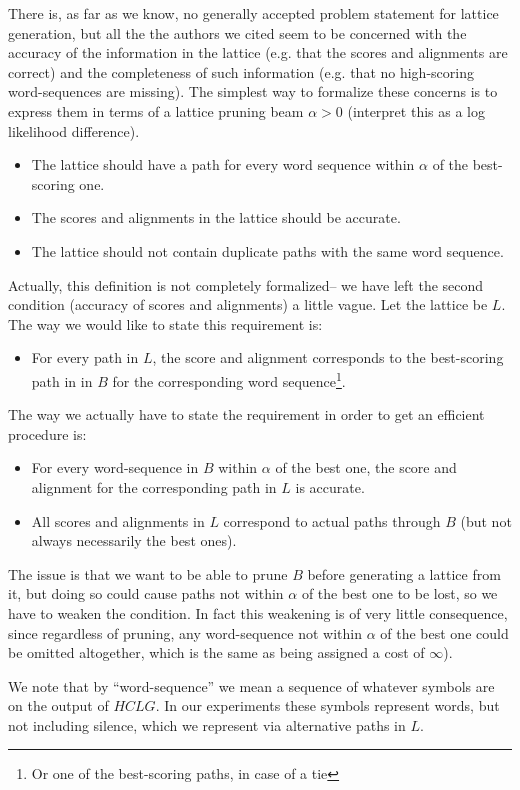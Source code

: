 \documentclass{article}
\def\HCLG{{\mathit{HCLG}}}
\begin{document}
There is, as far as we know, no generally accepted problem statement
for lattice generation, but all the the authors we cited seem to
be concerned with the accuracy of the information in the lattice (e.g. that the
scores and alignments are correct) and the completeness of such information (e.g.
that no high-scoring word-sequences are missing).  The simplest
way to formalize these concerns is to express them in terms of a lattice 
pruning beam $\alpha > 0$ (interpret this as a log likelihood difference).
\begin{itemize}
  \item The lattice should have a path for every word sequence within $\alpha$ of the best-scoring one.
  \item The scores and alignments in the lattice should be accurate.
  \item The lattice should not contain duplicate paths with the same word sequence.
\end{itemize}
Actually, this definition is not completely formalized-- we have left
the second condition (accuracy of scores and alignments) a little vague.
Let the lattice be $L$.  The way we would like to state this requirement is:
\begin{itemize}
  \item For every path in $L$, the score and alignment corresponds to 
   the best-scoring path in in $B$ for the corresponding word
   sequence\footnote{Or one of the best-scoring paths, in case of a tie}.
\end{itemize}
The way we actually have to state the requirement in order to get an efficient procedure is:
\begin{itemize}
  \item For every word-sequence in $B$ within $\alpha$ of the best one, the score and alignment
    for the corresponding path in $L$ is accurate.
  \item All scores and alignments in $L$ correspond to actual paths through $B$ (but not always
   necessarily the best ones).
\end{itemize}
The issue is that we want to be able to prune $B$ before generating a lattice from it,
but doing so could cause paths not within $\alpha$ of the best one to be lost, so we have
to weaken the condition.  In fact this weakening is of very little consequence, since regardless
of pruning, any word-sequence not within $\alpha$ of the best one could be omitted altogether, 
which is the same as being assigned a cost of $\infty$).

We note that by ``word-sequence'' we mean a sequence of whatever symbols are on the
output of $\HCLG$.  In our experiments these symbols represent words, but not including
silence, which we represent via alternative paths in $L$.
\end{document}
